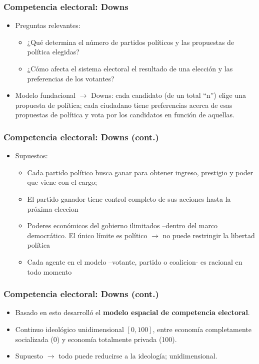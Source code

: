 \documentclass[14pt,aspectratio=169]{beamer}
\begin{document}
\begin{frame}
\frametitle{Competencia electoral: Downs}
\begin{itemize} 
\item Preguntas relevantes: \medskip
\begin{itemize} \itemsep 10pt
\item ¿Qué determina el número de partidos políticos y las propuestas de política elegidas?
\item ¿Cómo afecta el sistema electoral el resultado de una elección y las preferencias de los votantes?
\end{itemize}
\item Modelo fundacional $\longrightarrow$ Downs: cada candidato (de un total ``n'') elige una propuesta de política; cada ciudadano tiene preferencias acerca de esas propuestas de política y vota por los candidatos en función de aquellas.
\end{itemize}
\end{frame}


\begin{frame}\frametitle{Competencia electoral: Downs (cont.)}
  \begin{itemize}
  \item Supuestos:
    \begin{itemize}
      \item Cada partido político busca ganar para obtener ingreso,
        prestigio y poder que viene con el cargo;
      \item El partido ganador tiene control completo de sus acciones
      hasta la próxima eleccion
      \item Poderes económicos del gobierno ilimitados
        --dentro del marco democrático. El único límite es político
        $\longrightarrow$ no puede restringir la libertad política
        \item Cada agente en el modelo --votante, partido o coalicion-
          es racional en todo momento 
        \end{itemize}
\end{itemize}      
  \end{frame}



  \begin{frame}\frametitle{Competencia electoral: Downs (cont.)}
    \begin{itemize}
\item Basado en esto desarrolló el \textbf{modelo espacial de
  competencia electoral}. 
\item Continuo
  ideológico unidimensional $[0,100]$, entre economía completamente
  socializada (0) y economía totalmente privada (100).
\item Supuesto $\longrightarrow$ todo puede
  reducirse a la ideología; unidimensional.
  \end{itemize}
  \end{frame}
  
\end{document}
